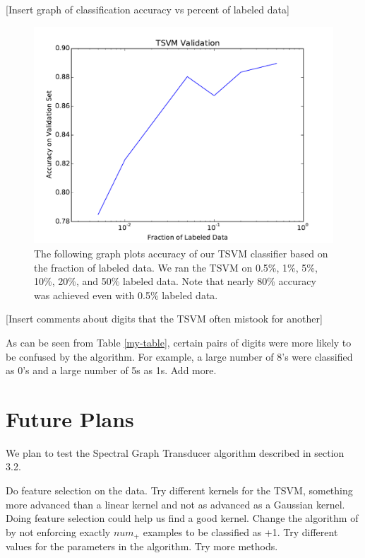 \documentclass[11pt]{article}
\begin{document}
[Insert graph of classification accuracy vs percent of labeled data]\par
\begin{figure}
  \centering
  \caption{The following graph plots accuracy of our TSVM classifier based on the fraction of labeled data. We ran the TSVM on 0.5\%, 1\%, 5\%, 10\%, 20\%, and 50\% labeled data. Note that nearly 80\% accuracy was achieved even with 0.5\% labeled data.}
  \includegraphics[width=5in]{tsvm.pdf}
\end{figure}

[Insert comments about digits that the TSVM often mistook for another]

As can be seen from Table \ref{my-table}, certain pairs of digits were more likely to be confused by the algorithm. For example, a large number of 8's were classified as 0's and a large number of 5s as 1s. Add more.

\section{Future Plans}

We plan to test the Spectral Graph Transducer algorithm described in
section 3.2.

Do feature selection on the data. 
Try different kernels for the TSVM, something more advanced than a linear kernel and not as advanced as a Gaussian kernel. Doing feature selection could help us find a good kernel. Change the algorithm of \cite{Joachims:1999} by not enforcing exactly $num_+$ examples to be classified as +1. Try different values for the parameters in the algorithm.
Try more methods.
\end{document}
